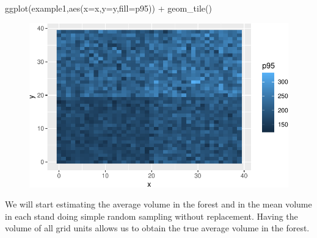 \documentclass[
  letterpaper,
  DIV=11,
  numbers=noendperiod]{scrartcl}
\newenvironment{Shaded}{\begin{snugshade}}{\end{snugshade}}
\newcommand{\AttributeTok}[1]{\textcolor[rgb]{0.40,0.45,0.13}{#1}}
\newcommand{\DecValTok}[1]{\textcolor[rgb]{0.68,0.00,0.00}{#1}}
\newcommand{\FloatTok}[1]{\textcolor[rgb]{0.68,0.00,0.00}{#1}}
\newcommand{\FunctionTok}[1]{\textcolor[rgb]{0.28,0.35,0.67}{#1}}
\newcommand{\NormalTok}[1]{\textcolor[rgb]{0.00,0.23,0.31}{#1}}
\newcommand{\OtherTok}[1]{\textcolor[rgb]{0.00,0.23,0.31}{#1}}
\newcommand{\SpecialCharTok}[1]{\textcolor[rgb]{0.37,0.37,0.37}{#1}}
\begin{document}
\begin{Shaded}
\begin{Highlighting}[]
\FunctionTok{ggplot}\NormalTok{(example1,}\FunctionTok{aes}\NormalTok{(}\AttributeTok{x=}\NormalTok{x,}\AttributeTok{y=}\NormalTok{y,}\AttributeTok{fill=}\NormalTok{p95)) }\SpecialCharTok{+} \FunctionTok{geom\_tile}\NormalTok{()}
\end{Highlighting}
\end{Shaded}

\begin{figure}[H]

{\centering \includegraphics{Regression_estimator_files/figure-pdf/unnamed-chunk-1-3.pdf}

}

\end{figure}

\begin{Shaded}
\end{Shaded}

We will start estimating the average volume in the forest and in the
mean volume in each stand doing simple random sampling without
replacement. Having the volume of all grid units allows us to obtain the
true average volume in the forest.
\end{document}
